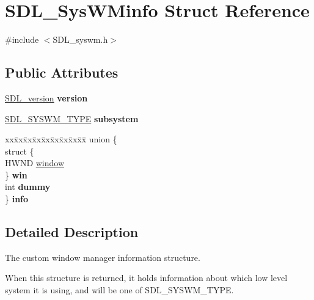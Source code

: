 \hypertarget{struct_s_d_l___sys_w_minfo}{}\section{S\+D\+L\+\_\+\+Sys\+W\+Minfo Struct Reference}
\label{struct_s_d_l___sys_w_minfo}


{\ttfamily \#include $<$S\+D\+L\+\_\+syswm.\+h$>$}

\subsection*{Public Attributes}
\begin{DoxyCompactItemize}
\item 
\mbox{\label{struct_s_d_l___sys_w_minfo_ac3a70af022d4849e9ff546595e94627f}} 
\hyperlink{struct_s_d_l__version}{S\+D\+L\+\_\+version} {\bfseries version}
\item 
\mbox{\label{struct_s_d_l___sys_w_minfo_a438b6a06ab3ee417293c7b7fc5a23855}} 
\hyperlink{_s_d_l__syswm_8h_a064c26598287280fff2a00d6758ac4f7}{S\+D\+L\+\_\+\+S\+Y\+S\+W\+M\+\_\+\+T\+Y\+PE} {\bfseries subsystem}
\item 
\mbox{\label{struct_s_d_l___sys_w_minfo_a96639a5304141225509483baf5910439}} 
\begin{tabbing}
xx\=xx\=xx\=xx\=xx\=xx\=xx\=xx\=xx\=\kill
union \{\\
\>struct \{\\
\>\>HWND \hyperlink{struct_s_d_l___sys_w_minfo_af06225591ff07e837bbd037728a525b9}{window}\\
\>\} {\bfseries win}\\
\>int {\bfseries dummy}\\
\} {\bfseries info}\\

\end{tabbing}\end{DoxyCompactItemize}


\subsection{Detailed Description}
The custom window manager information structure.

When this structure is returned, it holds information about which low level system it is using, and will be one of S\+D\+L\+\_\+\+S\+Y\+S\+W\+M\+\_\+\+T\+Y\+PE. 

